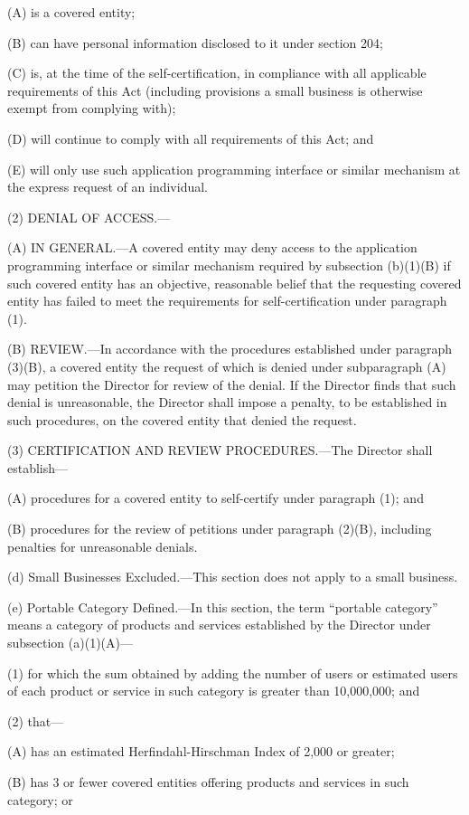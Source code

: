(A) is a covered entity;

(B) can have personal information disclosed to it under section 204;

(C) is, at the time of the self-certification, in compliance with all applicable requirements of this Act (including provisions a small business is otherwise exempt from complying with);

(D) will continue to comply with all requirements of this Act; and

(E) will only use such application programming interface or similar mechanism at the express request of an individual.

(2) DENIAL OF ACCESS.—

(A) IN GENERAL.—A covered entity may deny access to the application programming interface or similar mechanism required by subsection (b)(1)(B) if such covered entity has an objective, reasonable belief that the requesting covered entity has failed to meet the requirements for self-certification under paragraph (1).

(B) REVIEW.—In accordance with the procedures established under paragraph (3)(B), a covered entity the request of which is denied under subparagraph (A) may petition the Director for review of the denial. If the Director finds that such denial is unreasonable, the Director shall impose a penalty, to be established in such procedures, on the covered entity that denied the request.

(3) CERTIFICATION AND REVIEW PROCEDURES.—The Director shall establish—

(A) procedures for a covered entity to self-certify under paragraph (1); and

(B) procedures for the review of petitions under paragraph (2)(B), including penalties for unreasonable denials.

(d) Small Businesses Excluded.—This section does not apply to a small business.

(e) Portable Category Defined.—In this section, the term “portable category” means a category of products and services established by the Director under subsection (a)(1)(A)—

(1) for which the sum obtained by adding the number of users or estimated users of each product or service in such category is greater than 10,000,000; and

(2) that—

(A) has an estimated Herfindahl-Hirschman Index of 2,000 or greater;

(B) has 3 or fewer covered entities offering products and services in such category; or


